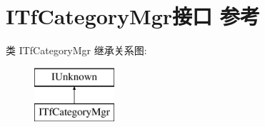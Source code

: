 \hypertarget{interface_i_tf_category_mgr}{}\section{I\+Tf\+Category\+Mgr接口 参考}
\label{interface_i_tf_category_mgr}
类 I\+Tf\+Category\+Mgr 继承关系图\+:\begin{figure}[H]
\begin{center}
\leavevmode
\includegraphics[height=2.000000cm]{interface_i_tf_category_mgr}
\end{center}
\end{figure}
